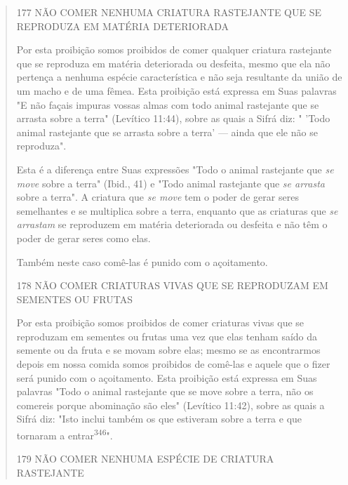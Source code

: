 \begin{quote}
177 NÃO COMER NENHUMA CRIATURA RASTEJANTE QUE SE REPRODUZA EM MATÉRIA
DETERIORADA

Por esta proibição somos proibidos de comer qualquer criatura
ras­tejante que se reproduza em matéria deteriorada ou desfeita, mesmo
que ela não pertença a nenhuma espécie característica e não seja
resultante da união de um macho e de uma fêmea. Esta proibição está
expressa em Suas palavras "E não façais impuras vossas 
almas com todo animal rastejante que se
arrasta sobre a terra" (Levítico 11:44), sobre as quais a Sifrá diz: "
'Todo animal raste­jante que se arrasta sobre a terra' --- ainda que ele
não se reproduza".

Esta é a diferença entre Suas expressões "Todo o animal rastejante que
\emph{se move} sobre a terra" (Ibid., 41) e "Todo animal rastejante que
\emph{se arrasta} sobre a terra". A criatura que \emph{se move} tem o
poder de gerar seres semelhantes e se multiplica sobre a terra, enquanto
que as criaturas que \emph{se arrastam} se re­produzem em matéria
deteriorada ou desfeita e não têm o poder de gerar seres como elas.

Também neste caso comê-las é punido com o açoitamento.

178 NÃO COMER CRIATURAS VIVAS QUE SE REPRODUZAM EM SEMENTES OU FRUTAS

Por esta proibição somos proibidos de comer criaturas vivas que se
reproduzam em sementes ou frutas uma vez que elas tenham saído da
semente ou da fruta e se movam sobre elas; mesmo se as encontrarmos
depois em nossa comida somos proibidos de comê-las e aquele que o fizer
será punido com o açoitamento. Esta proibição está expressa em Suas
palavras "Todo o animal ras­tejante que se move sobre a terra, não os
comereis porque abominação são eles" (Levítico 11:42), sobre as quais a
Sifrá diz: "Isto inclui também os que estive­ram sobre a terra e que
tornaram a entrar\textsuperscript{346}".

179 NÃO COMER NENHUMA ESPÉCIE DE CRIATURA RASTEJANTE
\end{quote}

